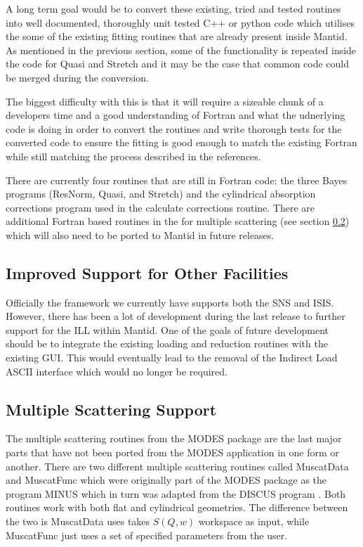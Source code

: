 \documentclass[paper=a4, fontsize=11pt]{scrartcl}	%
\numberwithin{equation}{section}															%
\numberwithin{figure}{section}																%
\numberwithin{table}{section}																%
\begin{document}
A long term goal would be to convert these existing, tried and tested routines into well documented, thoroughly unit tested C++ or python code which utilises the some of the existing fitting routines that are already present inside Mantid. As mentioned in the previous section, some of the functionality is repeated inside the code for Quasi and Stretch and it may be the case that common code could be merged during the conversion.

The biggest difficulty with this is that it will require a sizeable chunk of a developers time and a good understanding of Fortran and what the udnerlying code is doing in order to convert the routines and write thorough tests for the converted code to ensure the fitting is good enough to match the existing Fortran while still matching the process described in the references.

There are currently four routines that are still in Fortran code: the three Bayes programs (ResNorm, Quasi, and Stretch) and the cylindrical absorption corrections program used in the calculate corrections routine. There are additional Fortran based routines in the for multiple scattering (see section \ref{subsec:multiple-scattering}) which will also need to be ported to Mantid in future releases.

\subsection{Improved Support for Other Facilities}
Officially the framework we currently have supports both the SNS and ISIS. However, there has been a lot of development during the last release to further support for the ILL within Mantid. One of the goals of future development should be to integrate the existing loading and reduction routines with the existing GUI. This would eventually lead to the removal of the Indirect Load ASCII interface which would no longer be required.

\subsection{Multiple Scattering Support}
\label{subsec:multiple-scattering}
The multiple scattering routines from the MODES package are the last major parts that have not been ported from the MODES application in one form or another. There are two different multiple scattering routines called MuscatData and MuscatFunc which were originally part of the MODES package as the program MINUS which in turn was adapted from the DISCUS program \cite{wshowells2010}\cite{mjohnson1974}. Both routines work with both flat and cylindrical geometries. The difference between the two is MuscatData uses takes $S(Q,w)$ workspace as input, while MuscatFunc just uses a set of specified parameters from the user. 
\end{document}
